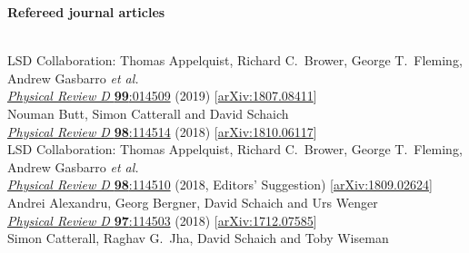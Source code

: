 \begin{spacelistout}
  \item {\large \bfseries Refereed journal articles}
  \begin{revnumerate}
    \setlength{\topsep}{-8 pt}
    \setlength{\itemsep}{10 pt}
    \setlength{\leftmargin}{0 mm}
    \pagebreakitem
       \\
      LSD Collaboration: Thomas Appelquist, Richard C.~Brower, George T.~Fleming, Andrew Gasbarro \textit{et al.} \\ %
      \href{http://dx.doi.org/10.1103/PhysRevD.99.014509}{\textit{Physical Review D} \textbf{99}:014509} (2019) [\href{http://arxiv.org/abs/1807.08411}{arXiv:1807.08411}]
    \pagebreakitem
       \\
      Nouman Butt, Simon Catterall and David Schaich \\
      \href{http://dx.doi.org/10.1103/PhysRevD.98.114514}{\textit{Physical Review D} \textbf{98}:114514} (2018) [\href{http://arxiv.org/abs/1810.06117}{arXiv:1810.06117}]
    \pagebreakitem
       \\
      LSD Collaboration: Thomas Appelquist, Richard C.~Brower, George T.~Fleming, Andrew Gasbarro \textit{et al.} \\ %
      \href{http://dx.doi.org/10.1103/PhysRevD.98.114510}{\textit{Physical Review D} \textbf{98}:114510} (2018, Editors' Suggestion) [\href{http://arxiv.org/abs/1809.02624}{arXiv:1809.02624}]
    \pagebreakitem
       \\
      Andrei Alexandru, Georg Bergner, David Schaich and Urs Wenger \\
      \href{http://dx.doi.org/10.1103/PhysRevD.97.114503}{\textit{Physical Review D} \textbf{97}:114503} (2018) [\href{http://arxiv.org/abs/1712.07585}{arXiv:1712.07585}]
    \pagebreakitem
       \\
      Simon Catterall, Raghav G.~Jha, David Schaich and Toby Wiseman \\

\end{revnumerate}
\end{spacelistout}
